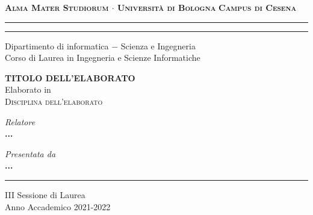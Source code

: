 \begin{titlepage}
    \begin{center}
        {\Large
            \textbf{
                \textsc{Alma Mater Studiorum $\cdot$ Università di Bologna}
            }
        }
        {\large
            \textbf{
                \textsc{Campus di Cesena}
            }
        }
        \rule[0.1cm]{16cm}{0.1mm}
        \rule[0.5cm]{16cm}{0.6mm}
        {\Large
                Dipartimento di informatica $-$ Scienza e Ingegneria \\
        }
        \vspace*{4mm}
        {\Large 
            Corso di Laurea in Ingegneria e Scienze Informatiche
        }
        \vspace*{40mm} %
        \begin{center}
            {\LARGE
                \textbf{
                    TITOLO DELL'ELABORATO \\
                }
            }
            \vspace*{20mm} %
            {\Large
                Elaborato in
            } \\
            \vspace*{3mm}
            {\Large
                \textsc{Disciplina dell'elaborato}
            }
        \end{center}
        \vspace*{45mm}
        \begin{minipage}[t]{0.47\textwidth}
            {\large
                \textit{Relatore} \\
                \textbf{
                    ...
                }
            }
        \end{minipage}
        \begin{minipage}[t]{0.47\textwidth}\raggedleft
            {\large
                \textit{Presentata da} \\
                \textbf{...}
            }
        \end{minipage}
    \end{center}
    \begin{center}
        \vspace*{30mm}
        \rule[0.1cm]{16cm}{0.1mm}  
    \end{center}
    \begin{center}
        {\large
            III Sessione di Laurea
        } \\
        \vspace*{2mm}
        {\large
            Anno Accademico 2021-2022
        }
    \end{center}
\end{titlepage}
\restoregeometry